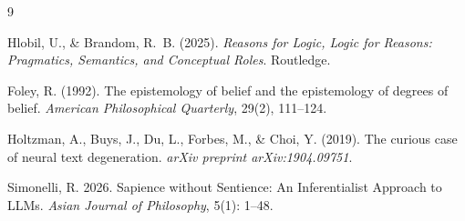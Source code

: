 \documentclass[11pt]{article}
\begin{document}
\begin{thebibliography}{9}

Hlobil, U., \& Brandom, R.~B. (2025). \emph{Reasons for Logic, Logic for Reasons: Pragmatics, Semantics, and Conceptual Roles}. Routledge.

Foley, R. (1992). The epistemology of belief and the epistemology of degrees of belief. \emph{American Philosophical Quarterly}, 29(2), 111--124.

Holtzman, A., Buys, J., Du, L., Forbes, M., \& Choi, Y. (2019). The curious case of neural text degeneration. \emph{arXiv preprint arXiv:1904.09751}.

Simonelli, R. 2026. Sapience without Sentience: An Inferentialist Approach to LLMs. \emph{Asian Journal of Philosophy}, 5(1): 1--48.



\end{thebibliography}
\end{document}
